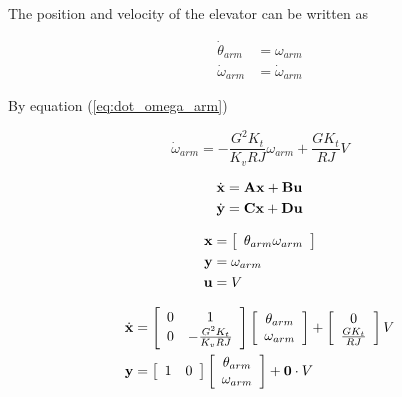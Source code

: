 The position and velocity of the elevator can be written as

\begin{align}
  \dot{\theta}_{arm} &= \omega_{arm} \label{eq:arm_cont_ss_pos} \\
  \dot{\omega}_{arm} &= \dot{\omega}_{arm} \label{eq:arm_cont_ss_vel}
\end{align}

By equation (\ref{eq:dot_omega_arm})

\begin{equation*}
  \dot{\omega}_{arm} = -\frac{G^2 K_t}{K_v RJ} \omega_{arm} + \frac{G K_t}{RJ} V
\end{equation*}

\begin{align*}
  \dot{\mathbf{x}} &= \mathbf{A} \mathbf{x} + \mathbf{B} \mathbf{u} \\
  \dot{\mathbf{y}} &= \mathbf{C} \mathbf{x} + \mathbf{D} \mathbf{u}
\end{align*}

\begin{align*}
  \mathbf{x} &= \left[
  \begin{array}{c}
    \theta_{arm}
    \omega_{arm}
  \end{array}
  \right] \\
  \mathbf{y} &= \omega_{arm} \\
  \mathbf{u} &= V
\end{align*}

\begin{align}
  \dot{\mathbf{x}} &= \left[
  \begin{array}{cc}
    0 & 1 \\
    0 & -\frac{G^2 K_t}{K_v RJ}
  \end{array}
  \right] \left[
  \begin{array}{c}
    \theta_{arm} \\
    \omega_{arm}
  \end{array}
  \right] + \left[
  \begin{array}{c}
    0 \\
    \frac{G K_t}{RJ}
  \end{array}
  \right] V \\
  \mathbf{y} &= \left[
  \begin{array}{cc}
    1 & 0
  \end{array}
  \right] \left[
  \begin{array}{c}
    \theta_{arm} \\
    \omega_{arm}
  \end{array}
  \right] + \mathbf{0} \cdot V
\end{align}

